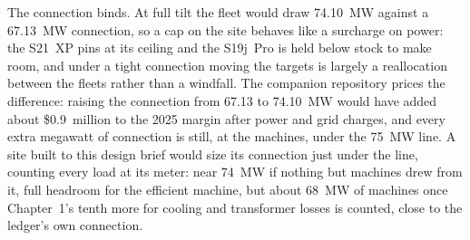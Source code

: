 The connection binds. At full tilt the fleet would draw 74.10~MW against a 67.13~MW connection, so a cap on the site behaves like a surcharge on power: the S21~XP pins at its ceiling and the S19j~Pro is held below stock to make room, and under a tight connection moving the targets is largely a reallocation between the fleets rather than a windfall. The companion repository prices the difference: raising the connection from 67.13 to 74.10~MW would have added about \$0.9~million to the 2025 margin after power and grid charges, and every extra megawatt of connection is still, at the machines, under the 75~MW line. %
A site built to this design brief would size its connection just under the line, counting every load at its meter: near 74~MW if nothing but machines drew from it, full headroom for the efficient machine, but about 68~MW of machines once Chapter~1's tenth more for cooling and transformer losses is counted, close to the ledger's own connection. %
